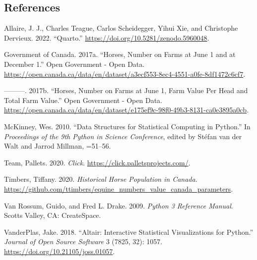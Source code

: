 \documentclass[
  letterpaper,
  DIV=11,
  numbers=noendperiod]{scrartcl}
\newlength{\cslhangindent}
\newenvironment{CSLReferences}[2] %
 {\begin{list}{}{%
  \setlength{\itemindent}{0pt}
  \setlength{\leftmargin}{0pt}
  \setlength{\parsep}{0pt}
  \ifodd #1
   \setlength{\leftmargin}{\cslhangindent}
   \setlength{\itemindent}{-1\cslhangindent}
  \fi
  \setlength{\itemsep}{#2\baselineskip}}}
 {\end{list}}
\begin{document}
\subsection*{References}\label{references}

\label{refs}
\begin{CSLReferences}{1}{0}
Allaire, J. J., Charles Teague, Carlos Scheidegger, Yihui Xie, and
Christophe Dervieux. 2022. {``{Quarto}.''}
\url{https://doi.org/10.5281/zenodo.5960048}.

Government of Canada. 2017a. {``Horses, Number on Farms at June 1 and at
December 1.''} Open Government - Open Data.
\url{https://open.canada.ca/data/en/dataset/a3ecf553-8ec4-4551-a0fe-8df1472c6cf7}.

---------. 2017b. {``Horses, Number on Farms at June 1, Farm Value Per
Head and Total Farm Value.''} Open Government - Open Data.
\url{https://open.canada.ca/data/en/dataset/e175ef9c-98f0-49b3-8131-ca0e3895a0cb}.

McKinney, Wes. 2010. {``Data Structures for Statistical Computing in
Python.''} In \emph{Proceedings of the 9th Python in Science
Conference}, edited by Stéfan van der Walt and Jarrod Millman, =51--56.

Team, Pallets. 2020. \emph{Click}.
\url{https://click.palletsprojects.com/}.

Timbers, Tiffany. 2020. \emph{Historical Horse Population in Canada}.
\url{https://github.com/ttimbers/equine_numbers_value_canada_parameters}.

Van Rossum, Guido, and Fred L. Drake. 2009. \emph{Python 3 Reference
Manual}. Scotts Valley, CA: CreateSpace.

VanderPlas, Jake. 2018. {``Altair: Interactive Statistical
Visualizations for Python.''} \emph{Journal of Open Source Software} 3
(7825, 32): 1057. \url{https://doi.org/10.21105/joss.01057}.

\end{CSLReferences}
\end{document}

